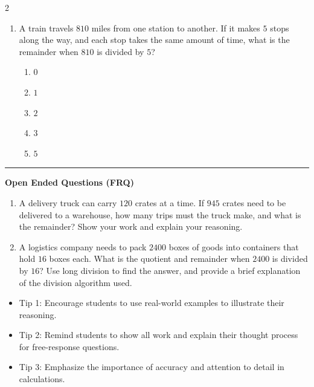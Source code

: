 \documentclass[10pt]{article}
\begin{document}
\begin{multicols}{2}
\begin{enumerate}[label=\textbf{Q\arabic*.}, leftmargin=*, itemsep=6pt, parsep=0pt]
  \item \small A train travels $810$ miles from one station to another. If it makes $5$ stops along the way, and each stop takes the same amount of time, what is the remainder when $810$ is divided by $5$?
  \begin{enumerate}[label=(\Alph*), leftmargin=0.6cm, nosep, itemsep=2pt]
    \item $0$
    \item $1$
    \item $2$
    \item $3$
    \item $5$
  \end{enumerate}

\end{enumerate}
\end{multicols}

\vspace{-0.2cm}
\hrule
\vspace{0.2cm}
\textbf{\small Open Ended Questions (FRQ)}
\begin{enumerate}[label=\textbf{Q\arabic*.}, start=9, itemsep=5pt, topsep=0pt]

  \item \small A delivery truck can carry $120$ crates at a time. If $945$ crates need to be delivered to a warehouse, how many trips must the truck make, and what is the remainder? Show your work and explain your reasoning. \vspace{2cm}

  \item \small A logistics company needs to pack $2400$ boxes of goods into containers that hold $16$ boxes each. What is the quotient and remainder when $2400$ is divided by $16$? Use long division to find the answer, and provide a brief explanation of the division algorithm used. \vspace{2cm}

\end{enumerate}

\vfill

\begin{tcolorbox}[colback=blue!5, colframe=mainblue!50, title=\small \textbf{Chef's Tips}, fonttitle=\bfseries, bottom=1mm]
\begin{itemize}[noitemsep, topsep=2pt, leftmargin=0.5cm]
  \item \scriptsize Tip 1: Encourage students to use real-world examples to illustrate their reasoning.\item \scriptsize Tip 2: Remind students to show all work and explain their thought process for free-response questions.\item \scriptsize Tip 3: Emphasize the importance of accuracy and attention to detail in calculations.
\end{itemize}
\end{tcolorbox}
\end{document}
